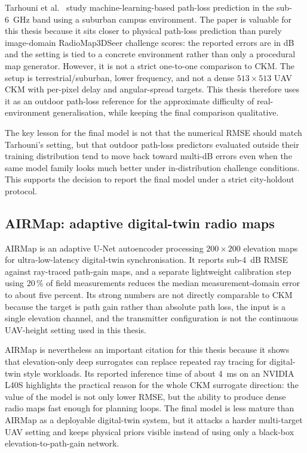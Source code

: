 Tarhouni et al.\ \cite{tarhouni2025} study machine-learning-based path-loss
prediction in the sub-\SI{6}{GHz} band using a suburban campus environment.  The
paper is valuable for this thesis because it sits closer to physical path-loss
prediction than purely image-domain RadioMap3DSeer challenge scores: the
reported errors are in dB and the setting is tied to a concrete environment
rather than only a procedural map generator.  However, it is not a strict
one-to-one comparison to CKM.  The setup is terrestrial/suburban, lower
frequency, and not a dense \(513\times513\) UAV CKM with per-pixel delay and
angular-spread targets.  This thesis therefore uses it as an outdoor path-loss
reference for the approximate difficulty of real-environment generalisation,
while keeping the final comparison qualitative.

The key lesson for the final model is not that the numerical RMSE should match
Tarhouni's setting, but that outdoor path-loss predictors evaluated outside
their training distribution tend to move back toward multi-dB errors even when
the same model family looks much better under in-distribution challenge
conditions. This supports the decision to report the final model under a strict
city-holdout protocol.

\subsection{AIRMap: adaptive digital-twin radio maps}

AIRMap \cite{airmap2025} is an adaptive U-Net autoencoder processing
\(200\times200\) elevation maps for ultra-low-latency digital-twin
synchronisation.  It reports sub-\SI{4}{dB} RMSE against ray-traced path-gain
maps, and a separate lightweight calibration step using 20\,\% of field
measurements reduces the median measurement-domain error to about five percent.
Its strong numbers are not directly comparable to CKM because the target is path
gain rather than absolute path loss, the input is a single elevation channel,
and the transmitter configuration is not the continuous UAV-height setting used
in this thesis.

AIRMap is nevertheless an important citation for this thesis because it shows
that elevation-only deep surrogates can replace repeated ray tracing for
digital-twin style workloads.  Its reported inference time of about
\SI{4}{ms} on an NVIDIA L40S highlights the practical reason for the whole CKM
surrogate direction: the value of the model is not only lower RMSE, but the
ability to produce dense radio maps fast enough for planning loops. The final model is
less mature than AIRMap as a deployable digital-twin system, but it attacks a
harder multi-target UAV setting and keeps physical priors visible instead of
using only a black-box elevation-to-path-gain network.

